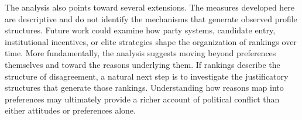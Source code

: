 \documentclass[12pt]{article}
\begin{document}
The analysis also points toward several extensions. The measures developed here
are descriptive and do not identify the mechanisms that generate observed
profile structures. Future work could examine how party systems, candidate
entry, institutional incentives, or elite strategies shape the organization of
rankings over time. More fundamentally, the analysis suggests moving beyond
preferences themselves and toward the reasons underlying them. If rankings
describe the structure of disagreement, a natural next step is to investigate
the justificatory structures that generate those rankings. Understanding how
reasons map into preferences may ultimately provide a richer account of
political conflict than either attitudes or preferences alone.





\end{document}
